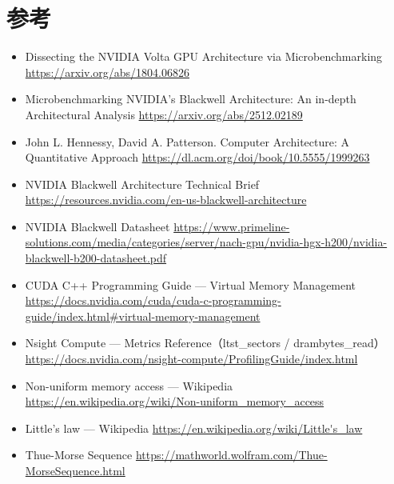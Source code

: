 \section{参考}

\begin{itemize}
  \item Dissecting the NVIDIA Volta GPU Architecture via Microbenchmarking \url{https://arxiv.org/abs/1804.06826}
  \item Microbenchmarking NVIDIA’s Blackwell Architecture: An in-depth Architectural Analysis \url{https://arxiv.org/abs/2512.02189}
  \item John L. Hennessy, David A. Patterson. Computer Architecture: A Quantitative Approach \url{https://dl.acm.org/doi/book/10.5555/1999263}
  \item NVIDIA Blackwell Architecture Technical Brief \url{https://resources.nvidia.com/en-us-blackwell-architecture}
  \item NVIDIA Blackwell Datasheet \url{https://www.primeline-solutions.com/media/categories/server/nach-gpu/nvidia-hgx-h200/nvidia-blackwell-b200-datasheet.pdf}
  \item CUDA C++ Programming Guide — Virtual Memory Management \url{https://docs.nvidia.com/cuda/cuda-c-programming-guide/index.html#virtual-memory-management}
  \item Nsight Compute — Metrics Reference（ltst\_sectors / drambytes\_read） \url{https://docs.nvidia.com/nsight-compute/ProfilingGuide/index.html}
  \item Non-uniform memory access — Wikipedia \url{https://en.wikipedia.org/wiki/Non-uniform_memory_access}
  \item Little’s law — Wikipedia \url{https://en.wikipedia.org/wiki/Little's_law}
  \item Thue-Morse Sequence \url{https://mathworld.wolfram.com/Thue-MorseSequence.html}
\end{itemize}
